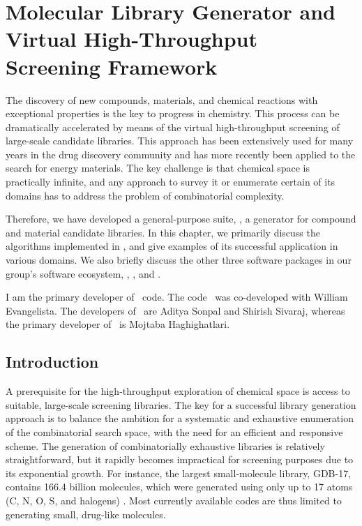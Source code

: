 \chapter{Molecular Library Generator and Virtual High-Throughput Screening Framework}
	

The discovery of new compounds, materials, and chemical reactions with exceptional properties is the key to progress in chemistry. This process can be dramatically accelerated by means of the virtual high-throughput screening of large-scale candidate libraries. This approach has been extensively used for many years in the drug discovery community and has more recently been applied to the search for energy materials. The key challenge is that chemical space is practically infinite, and any approach to survey it or enumerate certain of its domains has to address the problem of combinatorial complexity.

Therefore, we have developed a general-purpose suite, \chemlg , a generator for compound and material candidate libraries. In this chapter, we primarily discuss the algorithms implemented in \chemlg, and give examples of its successful application in various domains. We also briefly discuss the other three software packages in our group's software ecosystem, \chemhtps, \chembddb, and \chemml.

I am the primary developer of \chemlg\ code. The code \chemhtps\ was co-developed with William Evangelista. The developers of \chembddb\ are Aditya Sonpal and Shirish Sivaraj, whereas the primary developer of \chemml\ is Mojtaba Haghighatlari. 

\section{Introduction}

A prerequisite for the high-throughput exploration of chemical space is access to suitable, large-scale screening libraries. The key for a successful library generation approach is to balance the ambition for a systematic and exhaustive enumeration of the combinatorial search space, with the need for an efficient and responsive scheme. The generation of combinatorially exhaustive libraries is relatively straightforward, but it rapidly becomes impractical for screening purposes due to its exponential growth. For instance, the largest small-molecule library, GDB-17, contains 166.4 billion molecules, which were generated using only up to 17 atoms (C, N, O, S, and halogens) \cite{Reymond2012}. Most currently available codes are thus limited to generating small, drug-like molecules. 

